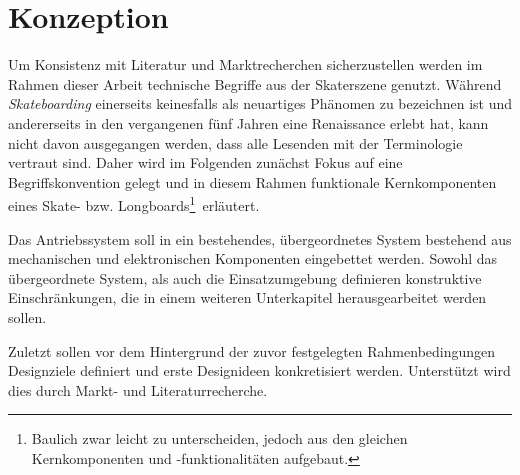 \chapter{Konzeption}
	Um Konsistenz mit Literatur und Marktrecherchen sicherzustellen werden im Rahmen dieser Arbeit technische Begriffe aus der Skaterszene genutzt.
	Während \textit{Skateboarding} einerseits keinesfalls als neuartiges Phänomen zu bezeichnen ist und  andererseits in den vergangenen fünf Jahren eine Renaissance erlebt hat, kann nicht davon ausgegangen werden, dass alle Lesenden mit der Terminologie vertraut sind.
	Daher wird im Folgenden zunächst Fokus auf eine Begriffskonvention gelegt und in diesem Rahmen funktionale Kernkomponenten eines Skate- bzw. Longboards\footnote{Baulich zwar leicht zu unterscheiden, jedoch aus den gleichen Kernkomponenten und -funktionalitäten aufgebaut.}~erläutert.\par\medskip
	Das Antriebssystem soll in ein bestehendes, übergeordnetes System bestehend aus mechanischen und elektronischen Komponenten eingebettet werden.
	Sowohl das übergeordnete System, als auch die Einsatzumgebung definieren konstruktive Einschränkungen, die in einem weiteren Unterkapitel herausgearbeitet werden sollen.\par\medskip
	Zuletzt sollen vor dem Hintergrund der zuvor festgelegten Rahmenbedingungen Designziele definiert und erste Designideen konkretisiert werden.
	Unterstützt wird dies durch Markt- und Literaturrecherche.
